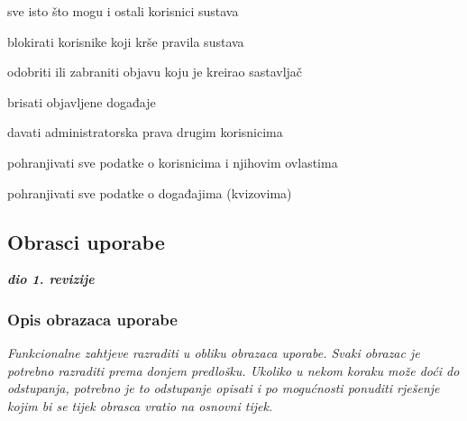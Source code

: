 \begin{packed_enum}
\begin{packed_enum}
				\end{packed_enum}
			
				\item  {}
				
				\begin{packed_enum}
					
					\item sve isto što mogu i ostali korisnici sustava
					\item blokirati korisnike koji krše pravila sustava 
					\item odobriti ili zabraniti objavu koju je kreirao sastavljač
					\item brisati objavljene događaje
					\item davati administratorska prava drugim korisnicima
					
				\end{packed_enum}
			
				\item  {}
				
				\begin{packed_enum}
					
					\item pohranjivati sve podatke o korisnicima i njihovim ovlastima
					\item pohranjivati sve podatke o događajima (kvizovima)
					
				\end{packed_enum}
			\end{packed_enum}
			
			\eject 
			
			
				
			\subsection{Obrasci uporabe}
				
				\textbf{\textit{dio 1. revizije}}
				
				\subsubsection{Opis obrazaca uporabe}
					\textit{Funkcionalne zahtjeve razraditi u obliku obrazaca uporabe. Svaki obrazac je potrebno razraditi prema donjem predlošku. Ukoliko u nekom koraku može doći do odstupanja, potrebno je to odstupanje opisati i po mogućnosti ponuditi rješenje kojim bi se tijek obrasca vratio na osnovni tijek.}\\
					

